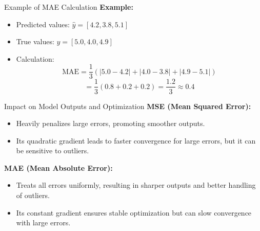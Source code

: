 \documentclass[serif, aspectratio=169]{beamer}
\begin{document}
\begin{frame}{Example of MAE Calculation}
    \textbf{Example:}
    \begin{itemize}
        \item Predicted values: \( \hat{y} = [4.2, 3.8, 5.1] \)
        \item True values: \( y = [5.0, 4.0, 4.9] \)
        \item Calculation:
        \[
        \text{MAE} = \frac{1}{3} \left( |5.0 - 4.2| + |4.0 - 3.8| + |4.9 - 5.1| \right)
        \]
        \[
        = \frac{1}{3} (0.8 + 0.2 + 0.2) = \frac{1.2}{3} \approx 0.4
        \]
    \end{itemize}
\end{frame}

\begin{frame}{Impact on Model Outputs and Optimization}
    \textbf{MSE (Mean Squared Error):}
    \begin{itemize}
        \item Heavily penalizes large errors, promoting smoother outputs.
        \item Its quadratic gradient leads to faster convergence for large errors, but it can be sensitive to outliers.
    \end{itemize}
    
    \textbf{MAE (Mean Absolute Error):}
    \begin{itemize}
        \item Treats all errors uniformly, resulting in sharper outputs and better handling of outliers.
        \item Its constant gradient ensures stable optimization but can slow convergence with large errors.
    \end{itemize}
\end{frame}
\end{document}
